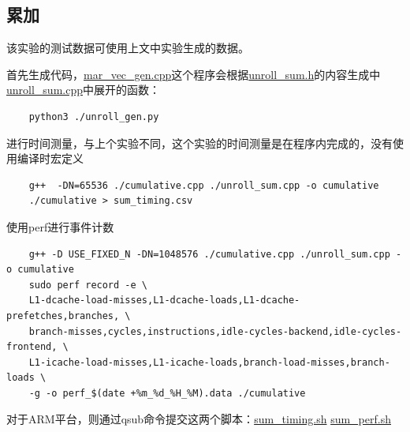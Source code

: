\documentclass[a4paper]{article}
\begin{document}
\subsection{累加}

该实验的测试数据可使用上文中实验生成的数据。

首先生成代码，\href{https://github.com/suhipek/NKU_parallel_programming/blob/main/2_cache_superscalar_profiling/mar_vec_gen.cpp}{mar\_vec\_gen.cpp}这个程序会根据\href{https://github.com/suhipek/NKU_parallel_programming/blob/main/2_cache_superscalar_profiling/unroll_sum.h}{unroll\_sum.h}的内容生成中\href{https://github.com/suhipek/NKU_parallel_programming/blob/main/2_cache_superscalar_profiling/unroll_sum.cpp}{unroll\_sum.cpp}中展开的函数：
\begin{verbatim}
    python3 ./unroll_gen.py
\end{verbatim}

进行时间测量，与上个实验不同，这个实验的时间测量是在程序内完成的，没有使用编译时宏定义
\begin{verbatim}
    g++  -DN=65536 ./cumulative.cpp ./unroll_sum.cpp -o cumulative
    ./cumulative > sum_timing.csv
\end{verbatim}

使用perf进行事件计数
\begin{verbatim}
    g++ -D USE_FIXED_N -DN=1048576 ./cumulative.cpp ./unroll_sum.cpp -o cumulative
    sudo perf record -e \
    L1-dcache-load-misses,L1-dcache-loads,L1-dcache-prefetches,branches, \
    branch-misses,cycles,instructions,idle-cycles-backend,idle-cycles-frontend, \
    L1-icache-load-misses,L1-icache-loads,branch-load-misses,branch-loads \
    -g -o perf_$(date +%m_%d_%H_%M).data ./cumulative
\end{verbatim}

对于ARM平台，则通过qsub命令提交这两个脚本：\href{https://github.com/suhipek/NKU_parallel_programming/blob/main/2_cache_superscalar_profiling/sum_timing.sh}{sum\_timing.sh} 
\href{https://github.com/suhipek/NKU_parallel_programming/blob/main/2_cache_superscalar_profiling/sum_perf.sh}{sum\_perf.sh}
\end{document}
